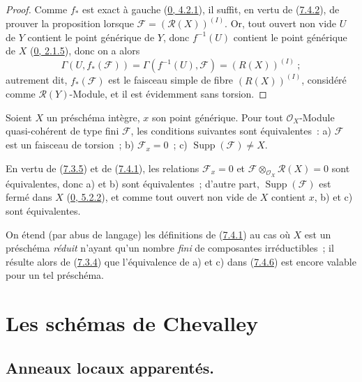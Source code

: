 \begin{proof}
Comme $f_*$ est exact à gauche
(\hyperref[0.4.2.1-fr]{0, 4.2.1}), il suffit, en vertu de
(\hyperref[I.7.4.2-fr]{7.4.2}), de prouver la proposition lorsque
$\mathscr{F}=(\mathscr{R}(X))^{(I)}$. Or, tout ouvert non vide $U$ de $Y$
contient le point générique de $Y$, donc $f^{-1}(U)$ contient le point
générique de $X$ (\hyperref[0.2.1.5-fr]{0, 2.1.5}), donc on a alors
\[
  \Gamma(U,f_*(\mathscr{F}))
  =\Gamma(f^{-1}(U),\mathscr{F})=(R(X))^{(I)}~;
\]
autrement dit, $f_*(\mathscr{F})$ est le faisceau simple de fibre
$(R(X))^{(I)}$, considéré comme $\mathscr{R}(Y)$-Module, et il est évidemment
sans torsion.
\end{proof}

\begin{proposition}[7.4.6]
\label{I.7.4.6-fr}
Soient $X$ un préschéma intègre, $x$ son point générique. Pour tout
$\mathscr{O}_X$-Module quasi-cohérent de type fini $\mathscr{F}$, les
conditions suivantes sont équivalentes~: a) $\mathscr{F}$ est un faisceau de
torsion~; b) $\mathscr{F}_x=0$~; c)
$\operatorname{Supp}(\mathscr{F})\neq X$.
\end{proposition}

En vertu de (\hyperref[I.7.3.5-fr]{7.3.5}) et de
(\hyperref[I.7.4.1-fr]{7.4.1}), les relations $\mathscr{F}_x=0$ et
$\mathscr{F}\otimes_{\mathscr{O}_X}\mathscr{R}(X)=0$ sont équivalentes, donc
a) et b) sont équivalentes~; d'autre part,
$\operatorname{Supp}(\mathscr{F})$ est fermé dans $X$
(\hyperref[0.5.2.2-fr]{0, 5.2.2}), et comme tout ouvert non vide de $X$
contient $x$, b) et c) sont équivalentes.

\begin{env}[7.4.7]
\label{I.7.4.7-fr}
On étend (par abus de langage) les définitions de
(\hyperref[I.7.4.1-fr]{7.4.1}) au cas où $X$ est un préschéma
\emph{réduit} n'ayant qu'un nombre \emph{fini} de composantes irréductibles~;
il résulte alors de (\hyperref[I.7.3.4-fr]{7.3.4}) que l'équivalence de a) et
c) dans (\hyperref[I.7.4.6-fr]{7.4.6}) est encore valable pour un tel
préschéma.
\end{env}

\section{Les schémas de Chevalley}
\label{section:I.8-fr}

\subsection{Anneaux locaux apparentés.}
\label{subsection:I.8.1-fr}

